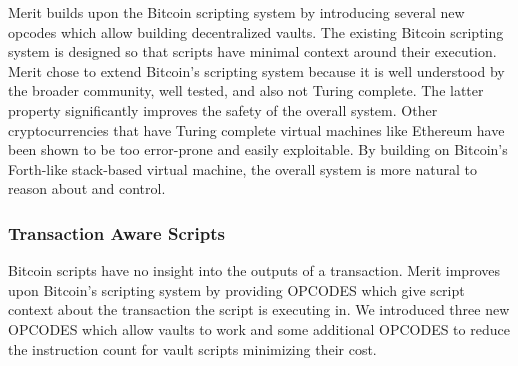 \documentclass{article}
\begin{document}
Merit builds upon the Bitcoin scripting system by introducing several new opcodes
which allow building decentralized vaults.  The existing Bitcoin scripting system
is designed so that scripts have minimal context around their execution.  Merit
chose to extend Bitcoin's scripting system because it is well understood by the
broader community, well tested, and also not Turing complete.  The latter property
significantly improves the safety of the overall system.  Other cryptocurrencies
that have Turing complete virtual machines like Ethereum have been shown to be too
error-prone and easily exploitable.  By building on Bitcoin's Forth-like stack-based
virtual machine, the overall system is more natural to reason about and control.

\subsubsection{Transaction Aware Scripts}
Bitcoin scripts have no insight into the outputs of a transaction.
Merit improves upon Bitcoin's scripting system by providing OPCODES which give
script context about the transaction the script is executing in.  We introduced
three new OPCODES which allow vaults to work and some additional OPCODES to reduce
the instruction count for vault scripts minimizing their cost.
\end{document}
